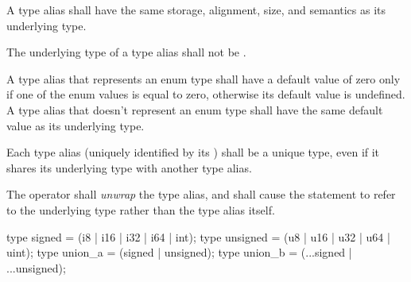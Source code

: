 \specsubsubitem
A type alias shall have the same storage, alignment, size, and semantics as its
underlying type.

\specsubsubitem
The underlying type of a type alias shall not be .

\specsubsubitem
A type alias that represents an enum type shall have a default value of zero
only if one of the enum values is equal to zero, otherwise its default value is
undefined. A type alias that doesn't represent an enum type shall have the same
default value as its underlying type.

\specsubsubitem
Each type alias (uniquely identified by its ) shall be
a unique type, even if it shares its underlying type with another type alias.

\specsubsubitem
The  operator shall \textit{unwrap} the type alias, and shall
cause the statement to refer to the underlying type rather than the type alias
itself.


\begin{codesample}
type signed = (i8 | i16 | i32 | i64 | int);
type unsigned = (u8 | u16 | u32 | u64 | uint);
type union_a = (signed | unsigned);
type union_b = (...signed | ...unsigned);
\end{codesample}
